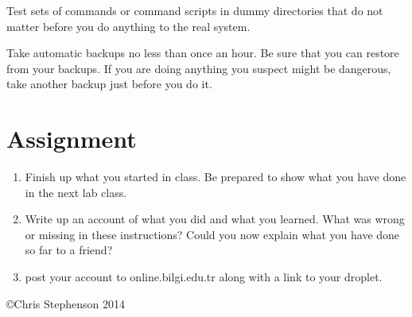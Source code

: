\documentclass[12pt, a4paper]{article}
\begin{document}
Test sets of commands or command scripts in dummy directories that do not matter before you do anything to the real system.

Take automatic backups no less than once an hour. Be sure that you can restore from your backups. If you are doing anything you suspect might be dangerous, take another backup just before you do it.




\section*{Assignment}


\begin{enumerate}
\item Finish up what you started in class. Be prepared to show what you have done in the next lab class. 
\item Write up an account of what you did and what you learned. What was wrong or missing in these instructions? Could you now explain what you have done so far to a friend?
\item post your account to online.bilgi.edu.tr along with a link to your droplet.

\end{enumerate}

\copyright Chris Stephenson 2014
\end{document}
